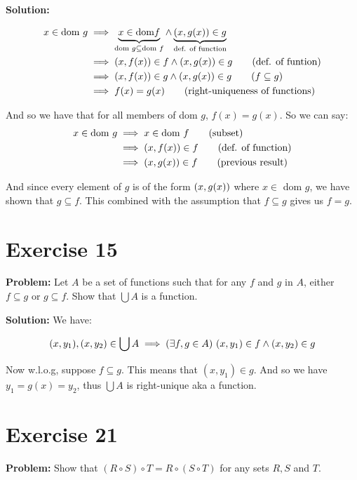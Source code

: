 \documentclass{article}
\begin{document}
\noindent\textbf{Solution:} 

\begin{align*}
    x\in \text{dom } g&\implies \underbrace{x\in\text{dom} f}_{\text{dom }g\subseteq\text{dom } f}\wedge\underbrace{(x,g(x))\in g}_{\text{def. of function}}\\
    &\implies (x,f(x))\in f\wedge(x,g(x))\in g\tag{def. of funtion}\\
    &\implies (x,f(x))\in g\wedge(x,g(x))\in g\tag{$f\subseteq g$}\\
    &\implies f(x)=g(x)\tag{right-uniqueness of functions}\\
\end{align*}

And so we have that for all members of dom $g$, $f(x)=g(x)$. So we can say:
\begin{align*}
    x\in \text{dom } g&\implies x\in\text{dom }f\tag{subset}\\
    &\implies (x,f(x))\in f\tag{def. of function}\\
    &\implies (x,g(x))\in f\tag{previous result}\\
\end{align*}

And since every element of $g$ is of the form $(x,g(x))$ where $x\in$ dom $g$, we have shown that $g\subseteq f$. This combined with the assumption that $f\subseteq g$ gives us $f=g$.

\section*{Exercise 15}
\noindent\textbf{Problem:} Let $A$ be a set of functions such that for any $f$ and $g$ in $A$, either $f\subseteq g$ or $g\subseteq f$. Show that $\bigcup A$ is a function.
\bigskip

\noindent\textbf{Solution:} We have:

\begin{equation*}
    (x,y_1),(x,y_2)\in\bigcup A\implies(\exists f,g\in A)\,\,(x,y_1)\in f\wedge(x,y_2)\in g
\end{equation*}

Now w.l.o.g, suppose $f\subseteq g$. This means that $(x,y_1)\in g$. And so we have $y_1=g(x)=y_2$, thus $\bigcup A$ is right-unique aka a function.

\section*{Exercise 21}
\noindent\textbf{Problem:} Show that $(R\circ S)\circ T=R\circ(S\circ T)$ for any sets $R,S$ and $T$.
\bigskip
\end{document}
